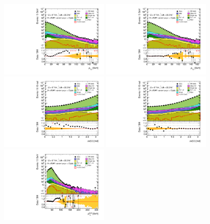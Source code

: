 \begin{figure}[p]
	\includegraphics[width=0.48\textwidth]{tex/backgrounds/ZpT-off/eemm_CutZControl_0jet_Ptll_mh125_log}
	\hfill
	\includegraphics[width=0.48\textwidth]{tex/backgrounds/ZpT-on/eemm_CutZControl_0jet_Ptll_mh125_log}
	\\
	\includegraphics[width=0.48\textwidth]{tex/backgrounds/ZpT-off/eemm_CutZControl_0jet_DPhill_mh125_log}
	\hfill
	\includegraphics[width=0.48\textwidth]{tex/backgrounds/ZpT-on/eemm_CutZControl_0jet_DPhill_mh125_log}
	\\
	\includegraphics[width=0.48\textwidth]{tex/backgrounds/ZpT-off/eemm_CutZControl_0jet_lepPtLead_mh125_log}

\end{figure}
